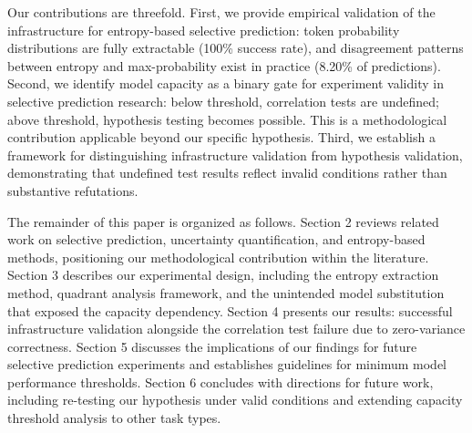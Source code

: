 Our contributions are threefold. First, we provide empirical validation of the infrastructure for entropy-based selective prediction: token probability distributions are fully extractable (100\% success rate), and disagreement patterns between entropy and max-probability exist in practice (8.20\% of predictions). Second, we identify model capacity as a binary gate for experiment validity in selective prediction research: below threshold, correlation tests are undefined; above threshold, hypothesis testing becomes possible. This is a methodological contribution applicable beyond our specific hypothesis. Third, we establish a framework for distinguishing infrastructure validation from hypothesis validation, demonstrating that undefined test results reflect invalid conditions rather than substantive refutations.

The remainder of this paper is organized as follows. Section 2 reviews related work on selective prediction, uncertainty quantification, and entropy-based methods, positioning our methodological contribution within the literature. Section 3 describes our experimental design, including the entropy extraction method, quadrant analysis framework, and the unintended model substitution that exposed the capacity dependency. Section 4 presents our results: successful infrastructure validation alongside the correlation test failure due to zero-variance correctness. Section 5 discusses the implications of our findings for future selective prediction experiments and establishes guidelines for minimum model performance thresholds. Section 6 concludes with directions for future work, including re-testing our hypothesis under valid conditions and extending capacity threshold analysis to other task types.
